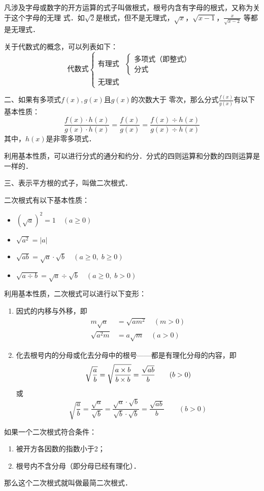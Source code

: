 凡涉及字母或数字的开方运算的式子叫做根式，根号内含有字母的根式，又称为关于这个字母的无理
式．如$\sqrt{2}$是根式，但不是无理式，$\sqrt{x}$，$\sqrt{x-1}$，$\frac{x}{\sqrt{x-2}}$
等都是无理式．

关于代数式的概念，可以列表如下：
\[
\text{代数式}\begin{cases}
    \text{有理式} & \begin{cases}
        \text{多项式（即整式）}\\\text{分式}
    \end{cases}\\
    \text{无理式}
\end{cases}    
\]

二、如果有多项式$f(x),g(x)$且$g(x)$的次数大于
零次，那么分式$\frac{f (x)}{g (x)}$有以下基本性质：
\[\frac{f (x) \cdot h (x)}{g(x)\cdot h(x)}=\frac{f(x)}{g (x)}=\frac{f (x) \div h (x)}{g(x)\div h(x)}\]
其中，$h(x)$是非零多项式．

利用基本性质，可以进行分式的通分和约分．分式的四则运算和分数的四则运算是一样的．

三、表示平方根的式子，叫做二次根式．

二次根式有以下基本性质：
\begin{itemize}
    \item $\left(\sqrt{a}\right)^2=1\quad (a\ge 0)$
    \item $\sqrt{a^2}=|a|$
    \item $\sqrt{ab}=\sqrt{a}\cdot \sqrt{b}\quad (a\ge 0,\; b\ge 0)$
    \item $\sqrt{a\div b}=\sqrt{a}\div \sqrt{b} \quad (a\ge 0,\; b>0)$
\end{itemize}

利用基本性质，二次根式可以进行以下变形：
\begin{enumerate}
    \item 因式的内移与外移，即
    \[\begin{split}
        m\sqrt{a}&=\sqrt{am^2}\quad (m>0)\\
        \sqrt{a^2m}&=a\sqrt{m}\quad (a>0)
    \end{split}\]
    \item 化去根号内的分母或化去分母中的根号——都是有理化分母的内容，即
\[\sqrt{\dfrac{a}{b}}=\sqrt{\dfrac{a\times b}{b\times b}}=\dfrac{\sqrt{ab}}{b}\qquad (b>0)\]
或
\[\sqrt{\frac{a}{b}}=\frac{\sqrt{a}}{\sqrt{b}}=\frac{\sqrt{a}\cdot \sqrt{b}}{\sqrt{b}\cdot \sqrt{b}}=\frac{\sqrt{ab}}{b}\qquad (b>0)\]
\end{enumerate}

如果一个二次根式符合条件：
\begin{enumerate}
    \item 被开方各因数的指数小于2；
    \item 根号内不含分母（即分母已经有理化）．
\end{enumerate}
那么这个二次根式就叫做最简二次根式．

